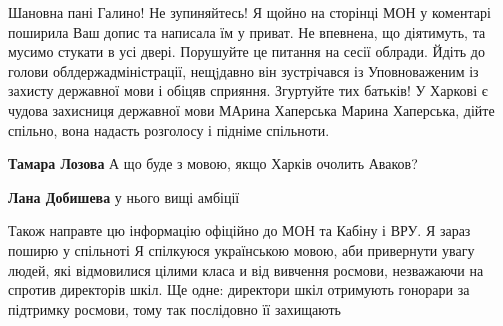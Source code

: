 \begin{itemize}
 

Шановна пані Галино! Не зупиняйтесь! Я щойно на сторінці МОН у коментарі
поширила Ваш допис та написала їм у приват. Не впевнена, що діятимуть, та
мусимо стукати в усі двері. Порушуйте це питання на сесії облради. Йдіть до
голови облдержадміністрації, нещjдавно він зустрічався із Уповноваженим із
захисту державної мови і обіцяв сприяння. Згуртуйте тих батьків! У Харкові є
чудова захисниця державної мови МАрина Хаперська Марина Хаперська, дійте
спільно, вона надасть розголосу і підніме спільноти.

\begin{itemize}
 
\textbf{Тамара Лозова} А що буде з мовою, якщо Харків очолить Аваков?

 
\textbf{Лана Добишева} у нього вищі амбіції
\end{itemize}

 

Також направте цю інформацію офіційно до МОН та Кабіну і ВРУ. Я зараз поширю у
спільноті Я спілкуюся українською мовою, аби привернути увагу людей, які
відмовилися цілими класа и від вивчення росмови, незважаючи на спротив
директорів шкіл. Ще одне: директори шкіл отримують гонорари за підтримку
росмови, тому так послідовно її захищають

\begin{itemize}
 

\end{itemize}
\end{itemize}
